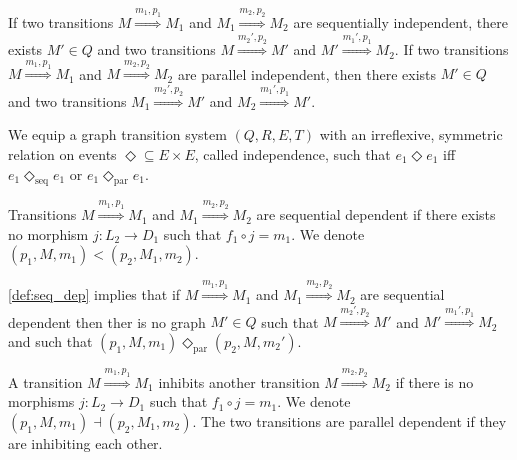\begin{lemma}
  \label{church_rosser}
  If two transitions $M\overset{m_1,p_1}{\Rightarrow} M_1$ and $M_1\overset{m_2,p_2}{\Rightarrow} M_2$ are sequentially independent, there exists $M'\in Q$ and two transitions $M\overset{m_2',p_2}{\Rightarrow} M'$ and $M'\overset{m_1',p_1}{\Rightarrow} M_2$. If two transitions $M\overset{m_1,p_1}{\Rightarrow} M_1$ and $M\overset{m_2,p_2}{\Rightarrow} M_2$ are parallel independent, then there exists $M'\in Q$ and two transitions $M_1\overset{m_2',p_2}{\Rightarrow} M'$ and $M_2\overset{m_1',p_1}{\Rightarrow} M'$.
\end{lemma}

We equip a graph transition system $(Q,R,E,T)$ with an irreflexive, symmetric relation on events $\Diamond\subseteq E\times E$, called independence, such that $e_1\Diamond e_1$ iff $e_1\Diamond_{\text{seq}} e_1$ or $e_1\Diamond_{\text{par}} e_1$.

\begin{definition}
  \label{def:seq_dep}
  Transitions $M\overset{m_1,p_1}{\Rightarrow} M_1$ and $M_1\overset{m_2,p_2}{\Rightarrow} M_2$ are sequential dependent if there exists no morphism  $j:L_2\to D_1$ such that $f_1\circ j= m_1$. We denote $(p_1,M,m_1) < (p_2,M_1,m_2)$.
\end{definition}

\autoref{def:seq_dep} implies that if $M\overset{m_1,p_1}{\Rightarrow} M_1$ and $M_1\overset{m_2,p_2}{\Rightarrow} M_2$ are sequential dependent then ther is no graph $M'\in Q$ such that $M\overset{m_2',p_2}{\Rightarrow} M'$ and $M'\overset{m_1',p_1}{\Rightarrow} M_2$ and such that $(p_1,M,m_1)\Diamond_{\text{par}}(p_2,M,m_2')$.

\begin{definition}
  \label{def:inhibition}
  A transition $M\overset{m_1,p_1}{\Rightarrow} M_1$ inhibits another transition $M\overset{m_2,p_2}{\Rightarrow} M_2$ if there is no morphisms $j:L_2\to D_1$ such that $f_1\circ j= m_1$. We denote $(p_1,M,m_1) \dashv (p_2,M_1,m_2)$.
  The two transitions are parallel dependent if they are inhibiting each other.

\end{definition}

